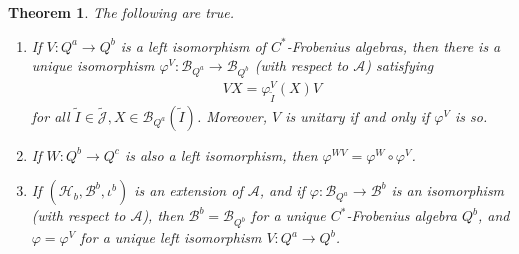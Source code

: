 \documentclass[11pt,b5paper,notitlepage]{article}
\theoremstyle{definition}
\theoremstyle{plain}
\newtheorem{thm}[df]{Theorem}
\newcommand{\mc}{\mathcal}
\newcommand{\wtd}{\widetilde}
\newcommand{\Jtd}{\widetilde{\mathcal J}}
\numberwithin{equation}{section}
\begin{document}
\begin{thm}\label{lb13}
The following are true.
\begin{enumerate}[label=(\alph*)]
\item If $V:Q^a\rightarrow Q^b$ is a left isomorphism of $C^*$-Frobenius algebras, then there is a unique isomorphism $\varphi^V:\mc B_{Q^a}\rightarrow\mc B_{Q^b}$ (with respect to $\mc A$) satisfying
\begin{align}
VX=\varphi_{\wtd I}^V(X)V	\label{eq19}
\end{align}
for all $\wtd I\in\Jtd,X\in\mc B_{Q^a}(\wtd I)$. Moreover, $V$ is unitary if and only if $\varphi^V$ is so. 
\item If $W:Q^b\rightarrow Q^c$ is also a left isomorphism, then $\varphi^{WV}=\varphi^W\circ\varphi^V$.
\item If $(\mc H_b,\mc B^b,\iota^b)$ is an extension of $\mc A$, and if $\varphi:\mc B_{Q^a}\rightarrow\mc B^b$ is an isomorphism (with respect to $\mc A$), then $\mc B^b=\mc B_{Q^b}$ for a unique $C^*$-Frobenius algebra $Q^b$, and $\varphi=\varphi^V$ for a unique left isomorphism $V:Q^a\rightarrow Q^b$.
\end{enumerate}
\end{thm}
\end{document}
